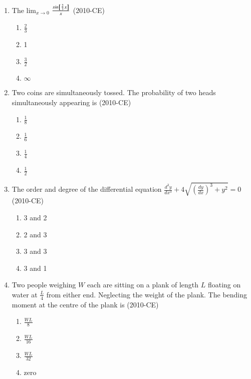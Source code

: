 \documentclass[journal,12pt,twocolumn]{IEEEtran}
\theoremstyle{remark}
\begin{document}
 \begin{enumerate}
		 
	 \item The {lim}$_{x \rightarrow 0}$ $\frac{sin{  {}\left[\frac{2}{3} x\right]}}{x}$ \hfill{(2010-CE)}

\begin{enumerate}
	\item $\frac{2}{3}$
	\item 1
	\item $\frac{3}{2}$
	\item $\infty$

\end{enumerate}


\item Two coins are simultaneously tossed. The probability of two heads simultaneously appearing is \hfill{(2010-CE)}

		\begin{enumerate}
		\item $\frac{1}{8}$ 

	\item $\frac{1}{6} $

	\item $\frac{1}{4} $

	\item $\frac{1}{2}$ 
		\end{enumerate}

\item The order and degree of the differential equation $\frac{d^{3}y}{dx^3} + 4 \sqrt{ (\frac{dy}{dx})^{3} +y^2}  =  0$ \hfill{(2010-CE)}

	\begin{enumerate}
\item 3 and 2
\item 2 and 3
\item 3 and 3
\item 3 and 1
	\end{enumerate}


\item Two people weighing $W$ each are sitting on a plank of length $L$ floating on water at $\frac{L}{4}$ from either end. Neglecting the weight of the plank. The bending moment at the centre of the plank is \hfill{(2010-CE)}

	\begin{enumerate}
     \item $\frac{WL}{8}$
\item $\frac{WL}{16}$
\item $\frac{WL}{32}$
\item zero
	\end{enumerate}


\end{enumerate}
\end{document}

